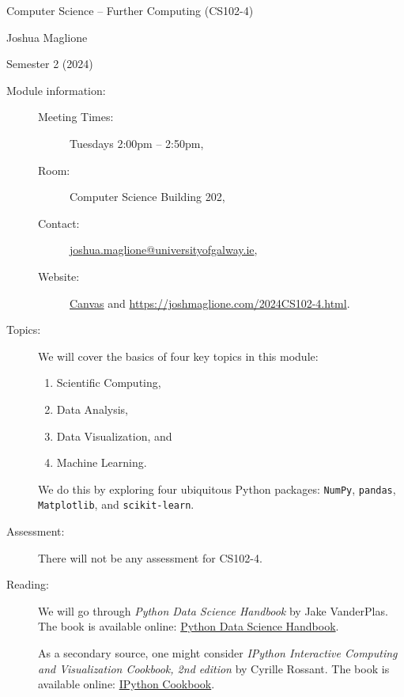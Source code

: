 \documentclass[a4paper, 12pt]{article}
\begin{document}
\pagestyle{empty}

\begin{center}
{\Large Computer Science -- Further Computing (CS102-4)} 

\vspace{0.25cm}

{\large Joshua Maglione}

\vspace{0.25cm}

Semester 2 (2024)
\end{center}

\vspace{0.5cm}

\begin{description}
    \item[Module information:] \hfill
    \begin{description}
      \item[Meeting Times:] Tuesdays 2:00pm -- 2:50pm,
      \item[Room:] Computer Science Building 202,
      \item[Contact:] \url{joshua.maglione@universityofgalway.ie},
      \item[Website:] \href{https://universityofgalway.instructure.com/}{\textsf{Canvas}} and \url{https://joshmaglione.com/2024CS102-4.html}.
    \end{description} 
    \vspace{1cm}
    \item[Topics:] We will cover the basics of four key topics in this module:
    \begin{enumerate} 
      \item Scientific Computing,
      \item Data Analysis,
      \item Data Visualization, and
      \item Machine Learning.
    \end{enumerate} 
    We do this by exploring four ubiquitous Python packages: \texttt{NumPy},
    \texttt{pandas}, \texttt{Matplotlib}, and \texttt{scikit-learn}.
    \vspace{1cm}
    \item[Assessment:] There will not be any assessment for CS102-4.
    \vspace{1cm}
    \item[Reading:] We will go through \textit{Python Data Science Handbook} by Jake VanderPlas. The book is available online:
    \href{https://jakevdp.github.io/PythonDataScienceHandbook/}{Python Data Science Handbook}. 
    
    As a secondary source, one might consider \textit{IPython Interactive Computing and Visualization Cookbook, 2nd edition} by Cyrille Rossant. The book is available online:
    \href{https://ipython-books.github.io/}{IPython Cookbook}.
\end{description}
\end{document}
